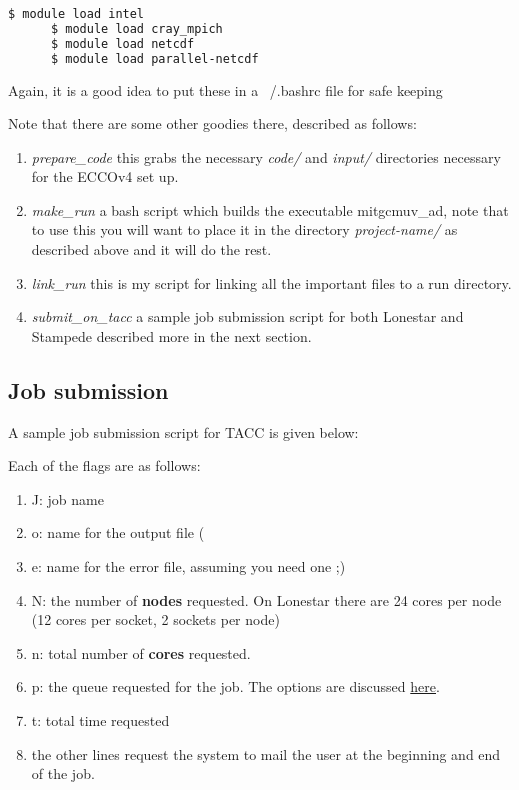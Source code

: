 \documentclass[a4paper,11pt]{article}
\begin{document}
	\begin{lstlisting}[language=bash]
	  $ module load intel
	  $ module load cray_mpich
	  $ module load netcdf
	  $ module load parallel-netcdf
	\end{lstlisting}

	Again, it is a good idea to put these in a ~/.bashrc file for safe keeping

	Note that there are some other goodies there, described as follows:
	\begin{enumerate}
	  \item \textit{prepare\_code} this grabs the necessary \textit{code/} and \textit{input/} directories necessary for the ECCOv4 set up. 
	  \item \textit{make\_run} a bash script which builds the executable mitgcmuv\_ad, note that to use this you will want to place it in the directory \textit{project-name/} as described above and it will do the rest. 
	  \item \textit{link\_run} this is my script for linking all the important files to a run directory.  
	  \item \textit{submit\_on\_tacc} a sample job submission script for both Lonestar and Stampede described more in the next section.
	\end{enumerate} 

	\subsection{Job submission} 

	A sample job submission script for TACC is given below: 
	
	

	Each of the flags are as follows: 
	\begin{enumerate}
	  \item J: job name
	  \item o: name for the output file (%
	  \item e: name for the error file, assuming you need one ;) 
	  \item N: the number of \textbf{nodes} requested. On Lonestar there are 24 cores per node (12 cores per socket, 2 sockets per node) 
	  \item n: total number of \textbf{cores} requested.
	  \item p: the queue requested for the job. The options are discussed \href{https://portal.tacc.utexas.edu/user-guides/lonestar5#production-queues}{here}.
	  \item t: total time requested 
	  \item the other lines request the system to mail the user at the beginning and end of the job.
	\end{enumerate}
\end{document}

